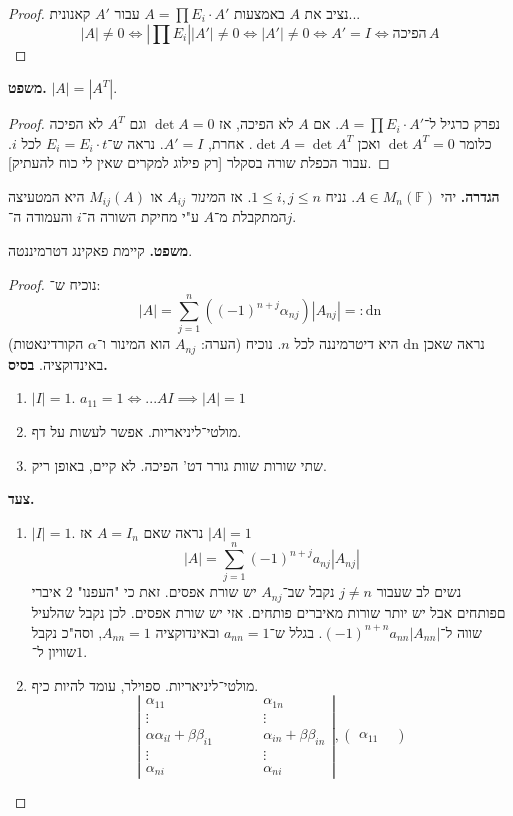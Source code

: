\documentclass[]{article}
\newcommand\F         {\mathbb{F}}
\newcommand\pms[1]    {\begin{pmatrix}
		#1
\end{pmatrix}}
\newcommand\vms[1]    {\left \vert \begin{matrix}
		#1
\end{matrix}\right\vert}
\newcommand\ag        {\alpha}
\newcommand\bg        {\beta}
\newcommand\cl [1]    {\left ( #1 \right )}
\begin{document}
	\begin{proof}
		נציב את $A$ באמצעות $A = \prod E_i \cdot A'$ עבור $A'$ קאנונית... 
		\[ |A| \neq 0 \iff |\prod E_i| |A'| \neq 0 \iff |A'| \neq 0 \iff A' = I \iff \text{הפיכה}\, A \]
	\end{proof}
	
	\textbf{משפט. }$|A| = |A^T|$. 
	\begin{proof}
		נפרק כרגיל ל־$A = \prod E_i \cdot A'$. אם $A$ לא הפיכה, אז $\det A = 0$ וגם $A^T$ לא הפיכה כלומר $\det A^T = 0$ ואכן $\det A = \det A^T$. 
		אחרת, $A' = I$. נראה ש־$E_i = E_i \cdot t$ לכל $i$. עבור הכפלת שורה בסקלר [רק פילוג למקרים שאין לי כוח להעתיק]. 
	\end{proof}
	
	\textbf{הגדרה. }יהי $A \in M_n(\F)$. נניח $1 \le i, j \le n$. אז ה\textit{מינור} $A_{ij}$ או $M_{ij}(A)$ היא המטעיצה המתקבלת מ־$A$ ע"י מחיקת השורה ה־$i$ והעמודה ה־$j$. 
	
	\textbf{משפט. }קיימת פאקינג דטרמיננטה. 
	
	\begin{proof}
		נוכיח ש־: 
		\[ |A| = \sum_{j = 1}^{n}\cl{(-1)^{n + j}\ag_{nj}} |A_{nj}| =: \mathrm{dn} \]
		(הערה: $A_{nj}$ הוא המינור ו־$\ag$ הקורדינאטות)
		נראה שאכן $\mathrm{dn}$ היא דיטרמיננה לכל $n$. נוכיח באינדוקציה. 
		\textbf{בסיס. }
		\begin{enumerate}
			\item $|I| = 1$. $a_{11} = 1 \iff ... AI \implies |A| = 1$
			\item מולטי־ליניאריות. אפשר לעשות על דף. 
			\item שתי שורות שוות גורר דט' הפיכה. לא קיים, באופן ריק. 
		\end{enumerate}
		\textbf{צעד. }
		\begin{enumerate}
			\item $|I| = 1$. נראה שאם $A = I_n$ אז $|A| = 1$
			\[ |A| = \sum_{j = 1}^{n}(-1)^{n + j}a_{nj} |A_{nj}| \]
			נשים לב שעבור $j \neq n$ נקבל שב־$A_{nj}$ יש שורת אפסים. זאת כי "העפנו" 2 איברי םפותחים אבל יש יותר שורות מאיברים פותחים. אזי יש שורת אפסים. לכן נקבל שהלעיל שווה ל־$(-1)^{n + n} a_{nn}|A_{nn}|$. בגלל ש־$a_{nn} = 1$ ובאינדוקציה $A_{nn} = 1$, וסה"כ נקבל שוויון ל־$1$. 
			\item מולטי־ליניאריות. ספוילר, עומד להיות כיף. 
			\[ \vms{\ag_{11} && \ag_{1n} \\
				\vdots && \vdots \\
				\ag \ag_{il} + \bg \bg_{i1} && \ag_{in} + \bg \bg_{in} \\
				\vdots && \vdots \\ \ag_{ni} & \quad \quad & \ag_{ni}}, \pms{\ag_{11} & } \]
		\end{enumerate}
		
	\end{proof}
	
\end{document}
